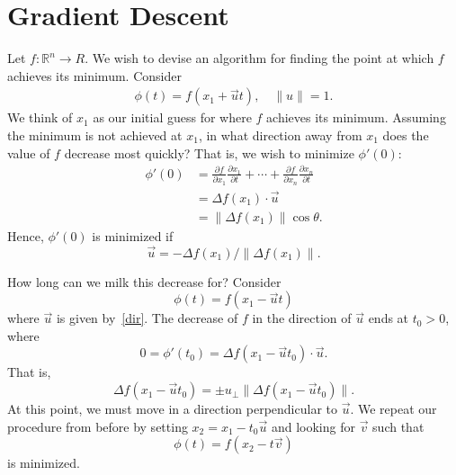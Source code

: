 \chapter{Gradient Descent}
Let $f: \mathbb{R}^{n} \to R$. We wish to devise an algorithm for finding the point at
which $f$ achieves its minimum. Consider
\begin{equation*}
	\begin{split}
		\phi(t) = f(x_{1} + \vec{u}t), \quad \| u \| = 1.
	\end{split}
\end{equation*}
We think of $x_{1}$ as our initial guess for where $f$ achieves its minimum.
Assuming the minimum is not achieved at $x_{1}$, in what direction away from
$x_{1}$ does the value of $f$ decrease most quickly? That is, we wish to
minimize $\phi'(0)$:
\begin{equation}
	\label{dir}
	\begin{split}
		\phi '(0) & = \frac{\partial f}{\partial x_{1}} \frac{\partial
		x_{1}}{\partial t} +\cdots + \frac{\partial f}{\partial x_{n}} \frac{\partial
		x_{n}}{\partial t} \\
		& = \Delta f(x_{1}) \cdot \vec{u} \\
		& = \| \Delta f (x_{1}) \| \cos \theta.
	\end{split}
\end{equation}
Hence, $\phi '(0)$ is minimized if
\begin{equation*}
	\vec{u} = -\Delta f(x_{1}) / \| \Delta f (x_{1}) \|.
\end{equation*}

How long can we milk this decrease for? Consider
\begin{equation*}
	\phi(t) = f(x_{1} - \vec{u} t)
\end{equation*}
where $\vec{u}$ is given by~\eqref{dir}. The decrease of $f$ in the direction of
$\vec{u}$ ends at $t_{0} > 0$, where
\begin{equation*}
	0 = \phi'(t_{0}) = \Delta f(x_{1} - \vec{u}t_{0}) \cdot \vec{u}.
\end{equation*}
That is,
\begin{equation*}
	\Delta f(x_{1} - \vec{u} t_{0}) = \pm u_{\perp} \| \Delta f(x_{1} -
\vec{u}t_{0}) \|.
\end{equation*}
At this point, we must move in a direction perpendicular to $\vec{u}$. 
We repeat our procedure from before by setting $x_{2} = x_{1} - t_{0}
\vec{u}$ and looking for $\vec{v}$ such that
\begin{equation*}
	\phi(t) = f(x_{2} - t \vec{v})
\end{equation*}
is minimized. 

